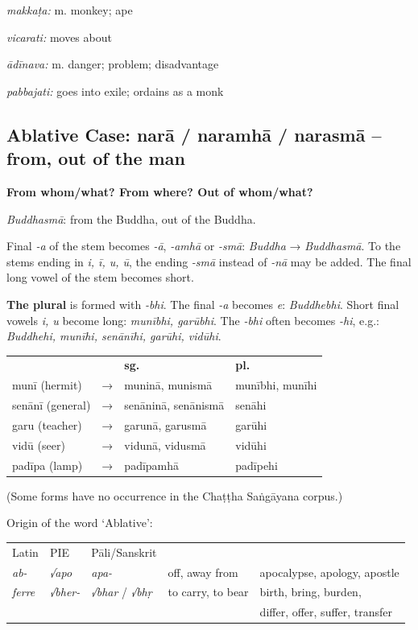 \documentclass[11pt,oneside]{memoir}
\begin{document}
\normalArrayStrech

\emph{makkaṭa:} m. monkey; ape

\emph{vicarati:} moves about

\emph{ādīnava:} m. danger; problem; disadvantage

\emph{pabbajati:} goes into exile; ordains as a monk

\clearpage

\subsection{Ablative Case: narā / naramhā / narasmā -- from, out of the man}
\label{sec:org588fb33}

\textbf{From whom/what? From where? Out of whom/what?}

\emph{Buddhasmā}: from the Buddha, out of the Buddha.

Final \emph{-a} of the stem becomes \emph{-ā}, \emph{-amhā} or \emph{-smā}: \emph{Buddha} → \emph{Buddhasmā}.
To the stems ending in \emph{i, ī, u, ū}, the ending \emph{-smā} instead of \emph{-nā} may be
added. The final long vowel of the stem becomes short.

\textbf{The plural} is formed with \emph{-bhi}. The final \emph{-a} becomes \emph{e}: \emph{Buddhebhi}.
Short final vowels \emph{i, u} become long: \emph{munībhi, garūbhi}. The \emph{-bhi} often
becomes \emph{-hi}, e.g.: \emph{Buddhehi, munīhi, senānīhi, garūhi, vidūhi}.

\begin{center}
\begin{tabular}{llll}
 &  & \textbf{sg.} & \textbf{pl.}\\[0pt]
munī (hermit) & → & muninā, munismā & munībhi, munīhi\\[0pt]
senānī (general) & → & senāninā, senānismā & senāhi\\[0pt]
garu (teacher) & → & garunā,  garusmā & garūhi\\[0pt]
vidū (seer) & → & vidunā, vidusmā & vidūhi\\[0pt]
padīpa (lamp) & → & padīpamhā & padīpehi\\[0pt]
\end{tabular}
\end{center}

(Some forms have no occurrence in the Chaṭṭha Saṅgāyana corpus.)

Origin of the word `Ablative':

\begin{center}
\begin{tabular}{lllll}
Latin & PIE & Pāli/Sanskrit &  & \\[0pt]
\emph{ab-} & \emph{√apo} & \emph{apa-} & off, away from & apocalypse, apology, apostle\\[0pt]
\emph{ferre} & \emph{√bher-} & \emph{√bhar} / \emph{√bhṛ} & to carry, to bear & birth, bring, burden,\\[0pt]
 &  &  &  & differ, offer, suffer, transfer\\[0pt]
\end{tabular}
\end{center}
\end{document}
